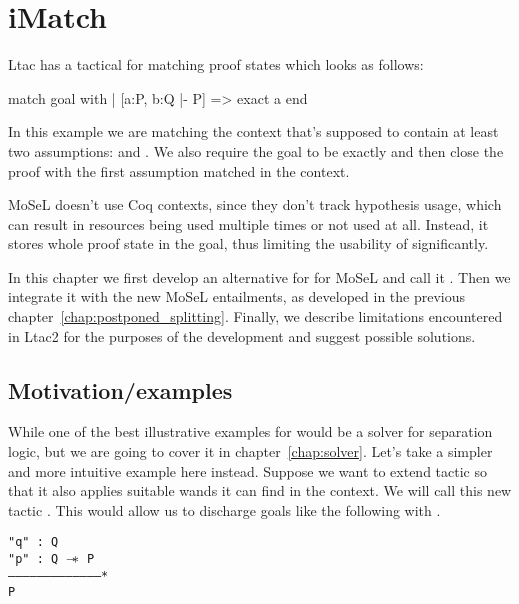 \chapter{iMatch}
\label{chap:imatch}

Ltac has a tactical for matching proof states which looks as follows:

\begin{coq}
match goal with
| [a:P, b:Q |- P] => exact a
end
\end{coq}

In this example we are matching the context that's supposed to contain at least two assumptions:  and .
We also require the goal to be exactly  and then close the proof with the first assumption matched in the context.

MoSeL doesn't use Coq contexts, since they don't track hypothesis usage, which can result in resources being used multiple times or not used at all.
Instead, it stores whole proof state in the goal, thus limiting the usability of  significantly.

In this chapter we first develop an alternative for  for MoSeL and call it .
Then we integrate it with the new MoSeL entailments, as developed in the previous chapter~\ref{chap:postponed_splitting}.
Finally, we describe limitations encountered in Ltac2 for the purposes of the development and suggest possible solutions.

\section{Motivation/examples}

While one of the best illustrative examples for  would be a solver for separation logic, but we are going to cover it in chapter~\ref{chap:solver}.
Let's take a simpler and more intuitive example here instead.
Suppose we want to extend  tactic so that it also applies suitable wands it can find in the context.
We will call this new tactic .
This would allow us to discharge goals like the following with .

\begin{minipage}{\linewidth}
\texttt{"q" : Q\\
"p" : Q $\mathrel{-\mkern-6mu*}$ P\\
---------------------------------------*\\
P
}
\end{minipage}

